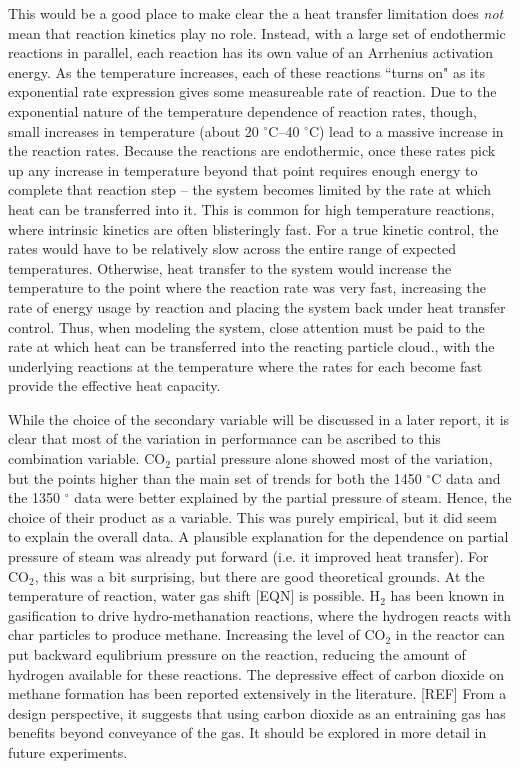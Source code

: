 \documentclass[11pt,twocolumn]{article}
\begin{document}

This would be a good place to make clear the a heat transfer limitation does \emph{not} mean that reaction kinetics play no role.  Instead, with a large set of endothermic reactions in parallel, each reaction has its own value of an Arrhenius activation energy.  As the temperature increases, each of these reactions ``turns on" as its exponential rate expression gives some measureable rate of reaction.  Due to the exponential nature of the temperature dependence of reaction rates, though, small increases in temperature (about 20 $^{\circ}$C--40 $^{\circ}$C) lead to a massive increase in the reaction rates.  Because the reactions are endothermic, once these rates pick up any increase in temperature beyond that point requires enough energy to complete that reaction step -- the system becomes limited by the rate at which heat can be transferred into it.  This is common for high temperature reactions, where intrinsic kinetics are often blisteringly fast.  For a true kinetic control, the rates would have to be relatively slow across the entire range of expected temperatures.  Otherwise, heat transfer to the system would increase the temperature to the point where the reaction rate was very fast, increasing the rate of energy usage by reaction and placing the system back under heat transfer control.  Thus, when modeling the system, close attention must be paid to the rate at which heat can be transferred into the reacting particle cloud., with the underlying reactions at the temperature where the rates for each become fast provide the effective heat capacity.

While the choice of the secondary variable will be discussed in a later report, it is clear that most of the variation in performance can be ascribed to this combination variable.  CO$_2$ partial pressure alone showed most of the variation, but the points higher than the main set of trends for both the 1450 $^{\circ}$C data and the 1350 $^{\circ}$ data were better explained by the partial pressure of steam.  Hence, the choice of their product as a variable.  This was purely empirical, but it did seem to explain the overall data.  A plausible explanation for the dependence on partial pressure of steam was already put forward (i.e. it improved heat transfer).  For CO$_2$, this was a bit surprising, but there are good theoretical grounds.  At the temperature of reaction, water gas shift [EQN] is possible.  H$_2$ has been known in gasification to drive hydro-methanation reactions, where the hydrogen reacts with char particles to produce methane.  Increasing the level of CO$_2$ in the reactor can put backward equlibrium pressure on the reaction, reducing the amount of hydrogen available for these reactions.  The depressive effect of carbon dioxide on methane formation has been reported extensively in the literature. [REF]  From a design perspective, it suggests that using carbon dioxide as an entraining gas has benefits beyond conveyance of the gas.  It should be explored in more detail in future experiments.
\end{document}
